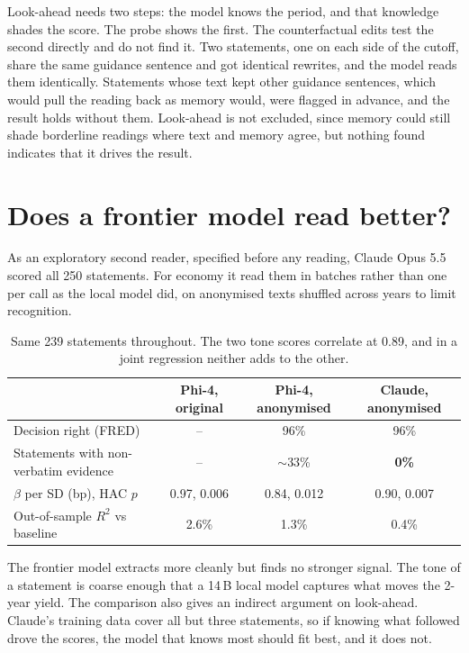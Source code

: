 \documentclass[11pt,a4paper]{article}
\begin{document}
Look-ahead needs two steps: the model knows the period, and that knowledge shades the score.
The probe shows the first. The counterfactual edits test the second directly and do not find
it. Two statements, one on each side of the cutoff, share the same guidance sentence and got
identical rewrites, and the model reads them identically. Statements whose text kept other
guidance sentences, which would pull the reading back as memory would, were flagged in advance,
and the result holds without them. Look-ahead is not excluded, since memory could still shade
borderline readings where text and memory agree, but nothing found indicates that it drives
the result.

\section{Does a frontier model read better?}

As an exploratory second reader, specified before any reading, Claude Opus 5.5 scored all 250
statements. For economy it read them in batches rather than one per call as the local model
did, on anonymised texts shuffled across years to limit recognition.

\begin{table}[H]
\centering\small
\begin{tabular}{lccc}
\toprule
 & Phi-4, original & Phi-4, anonymised & Claude, anonymised \\
\midrule
Decision right (FRED)              & -- & 96\% & 96\% \\
Statements with non-verbatim evidence & -- & $\sim$33\% & \textbf{0\%} \\
$\beta$ per SD (bp), HAC $p$       & 0.97, 0.006 & 0.84, 0.012 & 0.90, 0.007 \\
Out-of-sample $R^2$ vs baseline    & 2.6\% & 1.3\% & 0.4\% \\
\bottomrule
\end{tabular}
\caption{Same 239 statements throughout. The two tone scores correlate at 0.89, and in a joint
regression neither adds to the other.}
\end{table}

The frontier model extracts more cleanly but finds no stronger signal. The tone of a statement
is coarse enough that a 14\,B local model captures what moves the 2-year yield. The comparison
also gives an indirect argument on look-ahead. Claude's training data cover all but three
statements, so if knowing what followed drove the scores, the model that knows most should fit
best, and it does not.
\end{document}
